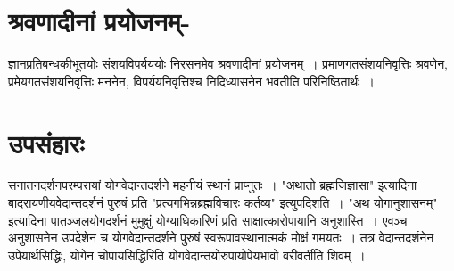 {\section*{श्रवणादीनां प्रयोजनम्-}

ज्ञानप्रतिबन्धकीभूतयोः संशयविपर्यययोः निरसनमेव श्रवणादीनां प्रयोजनम्~। प्रमाणगतसंशयनिवृत्तिः श्रवणेन, प्रमेयगतसंशयनिवृत्तिः मननेन, विपर्ययनिवृत्तिश्च निदिध्यासनेन भवतीति परिनिष्ठितार्थः~। 

\section*{उपसंहारः}

सनातनदर्शनपरम्परायां योगवेदान्तदर्शने महनीयं स्थानं प्राप्नुतः~। "अथातो ब्रह्मजिज्ञासा" इत्यादिना बादरायणीयवेदान्तदर्शनं पुरुषं प्रति "प्रत्यगभिन्नब्रह्मविचारः कर्तव्य" इत्युपदिशति~। "अथ योगानुशासनम्" इत्यादिना पातञ्जलयोगदर्शनं मुमुक्षुं योग्याधिकारिणं प्रति साक्षात्कारोपायानि अनुशास्ति~। एवञ्च अनुशासनेन उपदेशेन च योगवेदान्तदर्शने पुरुषं स्वरूपावस्थानात्मकं मोक्षं गमयतः~। तत्र वेदान्तदर्शनेन उपेयार्थसिद्धिः, योगेन चोपायसिद्धिरिति योगवेदान्तयोरुपायोपेयभावो वरीवर्तीति शिवम्~। 

\articleend
}
